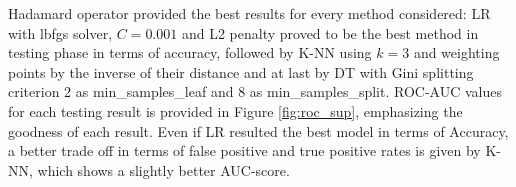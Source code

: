 \documentclass[sigchi]{acmart}
\begin{document}
\begin{table}[H]
  \centering
  \renewcommand{\arraystretch}{1.2}
\caption{Supervised link prediction task: validation and assessment results for each model and binary operators}
\label{table:stand_bin}
\end{table}

Hadamard operator provided the best results for every method considered: LR with lbfgs solver, $C=0.001$ and L2 penalty proved to be the best method in testing phase in terms of accuracy, followed by K-NN using $k=3$ and weighting points by the inverse of their distance and at last by DT with Gini splitting criterion 2 as min\_samples\_leaf and 8 as min\_samples\_split. ROC-AUC values for each testing result is provided in Figure \ref{fig:roc_sup}, emphasizing the goodness of each result. Even if LR resulted the best model in terms of Accuracy, a better trade off in terms of false positive and true positive rates is given by K-NN, which shows a slightly better AUC-score.
\end{document}
